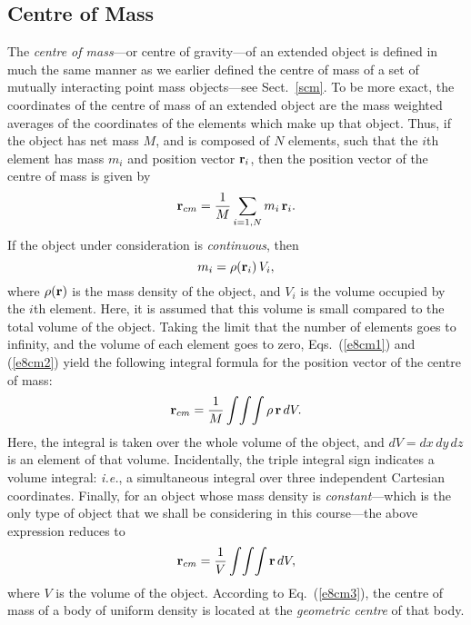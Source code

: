 \subsection{Centre of Mass}\label{s85}
The {\em centre of mass}---or centre of gravity---of an extended object is defined in much
the same manner as we earlier defined the  centre of mass of a set of mutually
interacting point mass objects---see Sect.~\ref{scm}. To be more exact, the
coordinates of the centre of mass of an extended object are the mass weighted
averages of the coordinates of the elements which make up that object. Thus,
if  the object has net mass $M$, and is composed of $N$ elements,
such that the $i$th element has mass $m_i$ and position vector ${\bf r}_i$, then the
position vector of the centre of mass is given by
\begin{equation}\label{e8cm1}
{\bf r}_{cm} = \frac{1}{M} \sum_{i=1,N} m_i\,{\bf r}_i.
\end{equation}
If the object under consideration is {\em  continuous}, then
\begin{equation}\label{e8cm2}
m_i = \rho({\bf r}_i)\,V_i,
\end{equation}
where $\rho({\bf r})$ is the mass density of the object, and $V_i$ is the volume occupied by the
$i$th element. Here, it is assumed that this volume is small compared to the
total volume of the object. Taking the limit that the number of elements goes to
infinity, and the volume of each element goes to zero, Eqs.~(\ref{e8cm1}) and (\ref{e8cm2})
yield the following integral formula for the position vector of the centre of mass:
\begin{equation}
{\bf r}_{cm} = \frac{1}{M} \int\!\int\!\int \rho\,{\bf r}\,dV.
\end{equation}
Here, the integral is taken over the whole volume of the object, and $dV = dx\,dy\,dz$ is an element
of that volume. Incidentally, the triple integral sign indicates a volume integral: {\em i.e.},
a simultaneous integral over three independent Cartesian coordinates.
Finally, for an object whose mass density is {\em constant}---which is the only type of
object that we shall be considering in this course---the above expression
reduces to
\begin{equation}\label{e8cm3}
{\bf r}_{cm} = \frac{1}{V} \int\!\int\!\int {\bf r}\,dV,
\end{equation}
where $V$ is the volume of the object. According to Eq.~(\ref{e8cm3}), 
the centre of mass of a body of uniform density is located at the {\em geometric centre} of that body.

